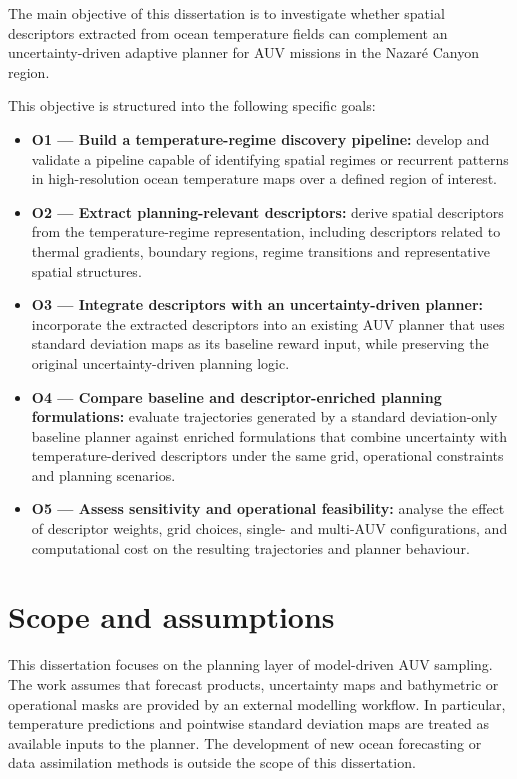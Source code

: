 The main objective of this dissertation is to investigate whether spatial descriptors extracted from ocean temperature fields can complement an uncertainty-driven adaptive planner for AUV missions in the Nazaré Canyon region.

This objective is structured into the following specific goals:

\begin{itemize}
  \item \textbf{O1 --- Build a temperature-regime discovery pipeline:} develop and validate a pipeline capable of identifying spatial regimes or recurrent patterns in high-resolution ocean temperature maps over a defined region of interest.

  \item \textbf{O2 --- Extract planning-relevant descriptors:} derive spatial descriptors from the temperature-regime representation, including descriptors related to thermal gradients, boundary regions, regime transitions and representative spatial structures.

  \item \textbf{O3 --- Integrate descriptors with an uncertainty-driven planner:} incorporate the extracted descriptors into an existing AUV planner that uses standard deviation maps as its baseline reward input, while preserving the original uncertainty-driven planning logic.

  \item \textbf{O4 --- Compare baseline and descriptor-enriched planning formulations:} evaluate trajectories generated by a standard deviation-only baseline planner against enriched formulations that combine uncertainty with temperature-derived descriptors under the same grid, operational constraints and planning scenarios.

  \item \textbf{O5 --- Assess sensitivity and operational feasibility:} analyse the effect of descriptor weights, grid choices, single- and multi-AUV configurations, and computational cost on the resulting trajectories and planner behaviour.
\end{itemize}




\section{Scope and assumptions} \label{sec:scope_assumptions}

This dissertation focuses on the planning layer of model-driven AUV sampling. The work assumes that forecast products, uncertainty maps and bathymetric or operational masks are provided by an external modelling workflow. In particular, temperature predictions and pointwise standard deviation maps are treated as available inputs to the planner. The development of new ocean forecasting or data assimilation methods is outside the scope of this dissertation.

